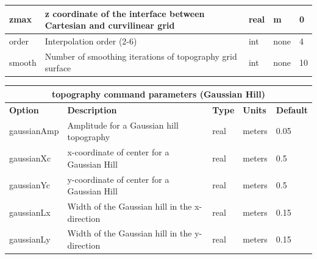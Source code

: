 \documentclass[11pt]{report}
\begin{document}
{\begin{center}
\begin{tabular}{|l|p{8cm}|l|l|l|}
		zmax        & z coordinate of the interface between  Cartesian and curvilinear grid & real      & m          & 0            \\ \hline
		order       & Interpolation order (2-6)                                             & int       & none       & 4            \\ \hline
		smooth      & Number of smoothing iterations of topography grid surface             & int       & none       & 10           \\ \hline
	\end{tabular}
\end{center}
\begin{center}
	\begin{tabular}{|l|p{8cm}|l|l|l|} \hline
		\multicolumn{5}{|c|}{\bf topography command parameters (Gaussian Hill)}                             \\ \hline
		\bf{Option} & \bf{Description}                              & \bf{Type} & \bf{Units} & \bf{Default} \\ \hline \hline
		gaussianAmp & Amplitude for a Gaussian hill topography      & real      & meters     & 0.05         \\ \hline
		gaussianXc  & x-coordinate of center for a Gaussian Hill    & real      & meters     & 0.5          \\ \hline
		gaussianYc  & y-coordinate of center for a Gaussian Hill    & real      & meters     & 0.5          \\ \hline
		gaussianLx  & Width of the Gaussian hill in the x-direction & real      & meters     & 0.15         \\ \hline
		gaussianLy  & Width of the Gaussian hill in the y-direction & real      & meters     & 0.15         \\ \hline
	\end{tabular}
\end{center}

}
\end{document}
